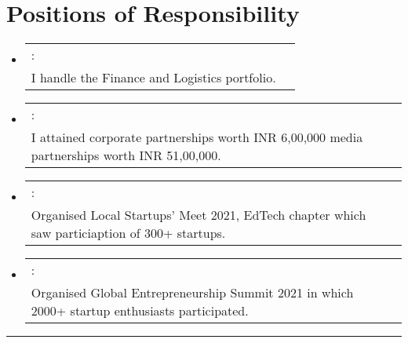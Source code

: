 \documentclass[a4paper,11pt]{article}
\makeatletter
\newcommand{\resumePOR}[3]{
\vspace{0.5mm}\item[]
    \begin{tabular*}{\textwidth}[t]{l@{\extracolsep{\fill}}r}
    \hspace{-3mm}{#1}:\hspace{1mm} & \hspace*{0pt}\hfill{\footnotesize{ #3}} \vspace{-0.5mm}\\ \hspace{-2.9mm}#2 
    \end{tabular*}
    \vspace{0mm}
}
\newcommand{\resumeSubHeadingListStart}{\begin{itemize}[leftmargin=*,labelsep=0mm,itemsep=-2.5mm]}
\newcommand{\resumeSubHeadingListEnd}{\end{itemize}\vspace{-2mm}}
\makeatother
\begin{document}
\vspace{-2.5mm}
\section{Positions of Responsibility}
\vspace{-0.4mm}

\resumeSubHeadingListStart
\resumePOR{\textbf{Senior Manager | Entrepreneurship Cell, IIT Kharagpur}} %
{I handle the Finance and Logistics portfolio.}{\raisebox{0.75pt}{July 2022 - Present}}
\vspace{0.5mm}
\resumePOR{\textbf{Associate Manager | Entrepreneurship Cell, IIT Kharagpur}}
{I attained corporate partnerships worth INR 6,00,000 media partnerships worth INR 51,00,000.}
{\raisebox{0.75pt}{November 2021 - July 2022}}
\vspace{0.5mm}
\resumePOR{\textbf{Associate Member | Entrepreneurship Cell, IIT Kharagpur}}
{Organised Local Startups' Meet 2021, EdTech chapter which saw particiaption of 300+ startups.}
{\raisebox{0.75pt}{May 2021 - November 2021}}
\resumePOR{\textbf{GES Intern | Entrepreneurship Cell, IIT Kharagpur}}
{Organised Global Entrepreneurship Summit 2021 in which 2000+ startup enthusiasts participated.}
{\raisebox{0.75pt}{January 2021 - May 2021}}
\vspace{0.5mm}
\resumeSubHeadingListEnd
\hspace*{-2mm}\rule{1.030\textwidth}{0.1mm}
\vspace{0mm}

\end{document}
